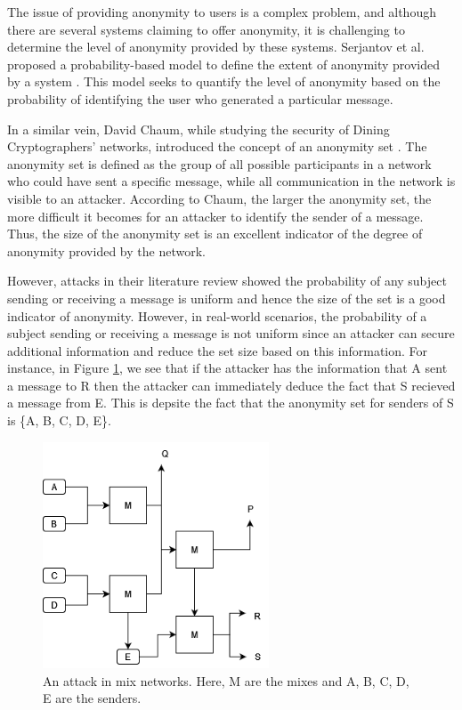 The issue of providing anonymity to users is a complex problem, and although there are several systems claiming to offer anonymity, it is challenging to determine the level of anonymity provided by these systems. Serjantov et al. proposed a probability-based model to define the extent of anonymity provided by a system \cite{andreiInformation}. This model seeks to quantify the level of anonymity based on the probability of identifying the user who generated a particular message.

In a similar vein, David Chaum, while studying the security of Dining Cryptographers' networks, introduced the concept of an anonymity set \cite{dining}. The anonymity set is defined as the group of all possible participants in a network who could have sent a specific message, while all communication in the network is visible to an attacker. According to Chaum, the larger the anonymity set, the more difficult it becomes for an attacker to identify the sender of a message. Thus, the size of the anonymity set is an excellent indicator of the degree of anonymity provided by the network.

However, attacks in their literature review showed the probability of any subject sending or receiving a message is uniform and hence the size of the set is a good indicator of anonymity. However, in real-world scenarios, the probability of a subject sending or receiving a message is not uniform since an attacker can secure additional information and reduce the set size based on this information. For instance, in Figure \ref{fig:mix}, we see that if the attacker has the information that A sent a message to R then the attacker can immediately deduce the fact that S recieved a message from E. This is depsite the fact that the anonymity set for senders of S is \{A, B, C, D, E\}. 

\begin{figure}[H]
\centering
\includegraphics[width=0.6\textwidth]{images/mix.png}
\caption{An attack in mix networks. Here, M are the mixes and A, B, C, D, E are the senders.}
\label{fig:mix}
\end{figure}

